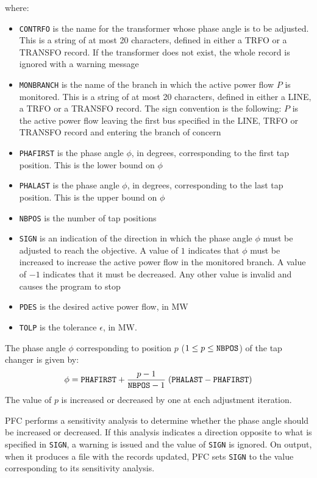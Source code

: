 where:
\begin{itemize}
\item {\tt CONTRFO} is the name for the transformer whose phase angle is to be adjusted. This is a string of at most 20 characters, defined in either a TRFO or a TRANSFO record. If the transformer does
not exist, the whole record is ignored with a warning message
\item {\tt MONBRANCH} is the name of the branch in which the active power flow $P$ is
monitored. This is a string of at most 20 characters, defined in either a LINE, a TRFO or a TRANSFO record.  The sign convention is the following: $P$ is the active power flow leaving the first bus specified in the LINE, TRFO or TRANSFO record and entering the branch of concern
\item {\tt PHAFIRST} is the phase angle $\phi$, in degrees, corresponding to the first tap position. This is the lower bound on $\phi$
\item {\tt PHALAST} is the phase angle $\phi$, in degrees, corresponding to the last tap position. This is the upper bound on $\phi$
\item {\tt NBPOS} is the number of tap positions
\item {\tt SIGN} is an indication of the direction in which the phase angle $\phi$ must be adjusted to reach the objective. A value of $1$ indicates that $\phi$ must be increased to increase the active power flow in the monitored branch. A value of $-1$ indicates that it must be decreased. Any other value is invalid and causes the program to stop
\item {\tt PDES} is the desired active power flow, in MW
\item {\tt TOLP} is the tolerance $\epsilon$, in MW.
\end{itemize}

The phase angle $\phi$ corresponding to position $p$ ($1 \le p \le {\tt NBPOS}$) of the tap changer is given by:
\begin{equation}\label{equ-pf-phivalue}
\phi = {\tt PHAFIRST} + \frac{p-1}{{\tt NBPOS}-1} \; ({\tt PHALAST} - {\tt PHAFIRST})
\end{equation}
The value of $p$ is increased or decreased by one at each adjustment iteration.

PFC performs a sensitivity analysis to determine whether the phase angle should be increased or decreased. If this analysis indicates a direction opposite to what is specified in {\tt SIGN}, a warning is issued and the value of {\tt SIGN} is ignored. On output, when it produces a file with the records updated, PFC sets {\tt SIGN} to the value corresponding to its sensitivity analysis.

